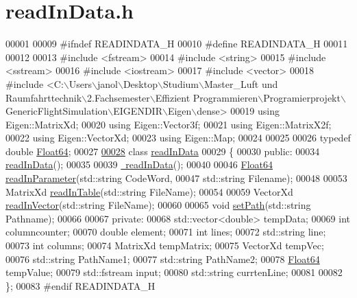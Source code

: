 \hypertarget{read_in_data_8h_source}{}\section{read\+In\+Data.\+h}
\label{read_in_data_8h_source}

\begin{DoxyCode}
00001 
00009 \textcolor{preprocessor}{#ifndef READINDATA\_H}
00010 \textcolor{preprocessor}{#define READINDATA\_H}
00011 
00012 
00013 \textcolor{preprocessor}{#include <fstream>}
00014 \textcolor{preprocessor}{#include <string>}
00015 \textcolor{preprocessor}{#include <sstream>}
00016 \textcolor{preprocessor}{#include <iostream>}
00017 \textcolor{preprocessor}{#include <vector>}
00018 \textcolor{preprocessor}{#include <C:\(\backslash\)Users\(\backslash\)janol\(\backslash\)Desktop\(\backslash\)Studium\(\backslash\)Master\_Luft und Raumfahrttechnik\(\backslash\)2.Fachsemester\(\backslash\)Effizient
       Programmieren\(\backslash\)Programierprojekt\(\backslash\)GenericFlightSimulation\(\backslash\)EIGENDIR\(\backslash\)Eigen\(\backslash\)dense>}
00019 \textcolor{keyword}{using} Eigen::MatrixXd;
00020 \textcolor{keyword}{using} Eigen::Vector3f;
00021 \textcolor{keyword}{using} Eigen::MatrixX2f;
00022 \textcolor{keyword}{using} Eigen::VectorXd;
00023 \textcolor{keyword}{using} Eigen::Map;
00024 
00025 
00026 \textcolor{keyword}{typedef} \textcolor{keywordtype}{double} \hyperlink{group___tools_ga3f1431cb9f76da10f59246d1d743dc2c}{Float64};
00027 
\hyperlink{classread_in_data}{00028} \textcolor{keyword}{class }\hyperlink{classread_in_data}{readInData}
00029 \{
00030 \textcolor{keyword}{public}:
00034     \hyperlink{classread_in_data_adf5f563c9d967b1291c8a26c61b33c27}{readInData}();
00035 
00039     \hyperlink{classread_in_data_af34d37cf1fb596bca7f1f9c1c97fd2eb}{~readInData}();
00040 
00046     \hyperlink{group___tools_ga3f1431cb9f76da10f59246d1d743dc2c}{Float64} \hyperlink{classread_in_data_a9ae979e74958b43424cb6cf4a22043d7}{readInParameter}(std::string CodeWord, 
00047                             std::string Filename);
00048 
00053      MatrixXd \hyperlink{classread_in_data_af616573832efc2c27f07f5f6877b1386}{readInTable}(std::string FileName);
00054 
00059     VectorXd \hyperlink{classread_in_data_ab57aff38529234593d786ecace301cf7}{readInVector}(std::string FileName);
00060 
00065     \textcolor{keywordtype}{void} \hyperlink{classread_in_data_ad67d566fd837f6d721db279144d484e0}{setPath}(std::string Pathname);
00066 
00067 \textcolor{keyword}{private}:
00068     std::vector<double> tempData;
00069     \textcolor{keywordtype}{int} columncounter;
00070     \textcolor{keywordtype}{double} element;
00071     \textcolor{keywordtype}{int} lines;
00072     std::string line;
00073     \textcolor{keywordtype}{int} columns;
00074     MatrixXd tempMatrix;
00075     VectorXd tempVec;
00076     std::string PathName1;
00077     std::string PathName2;
00078     \hyperlink{group___tools_ga3f1431cb9f76da10f59246d1d743dc2c}{Float64} tempValue;
00079     std::fstream input;
00080     std::string currtenLine;
00081 
00082 \};
00083 \textcolor{preprocessor}{#endif READINDATA\_H}
\end{DoxyCode}
